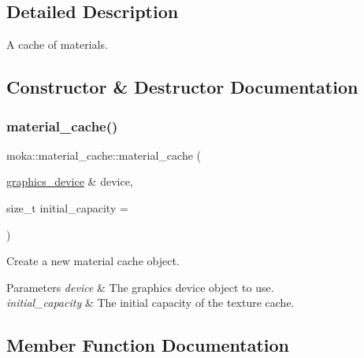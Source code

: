 \subsection{Detailed Description}
A cache of materials. 

\subsection{Constructor \& Destructor Documentation}
\mbox{\label{classmoka_1_1material__cache_a0cf9e1de19ab63480f689da817466dae}} 
\subsubsection{\texorpdfstring{material\_cache()}{material\_cache()}}
{\footnotesize\ttfamily moka\+::material\+\_\+cache\+::material\+\_\+cache (\begin{DoxyParamCaption}\item[{\mbox{\hyperlink{classmoka_1_1graphics__device}{graphics\+\_\+device}} \&}]{device,  }\item[{size\+\_\+t}]{initial\+\_\+capacity = {} }\end{DoxyParamCaption})\hspace{0.3cm}{\ttfamily [explicit]}}



Create a new material cache object. 


\begin{DoxyParams}{Parameters}
{\em device} & The graphics device object to use. \\
\hline
{\em initial\+\_\+capacity} & The initial capacity of the texture cache. \\
\hline
\end{DoxyParams}


\subsection{Member Function Documentation}
\mbox{\label{classmoka_1_1material__cache_a9ddd120e506cfaaa3386f5e2e9c031b3}} 
